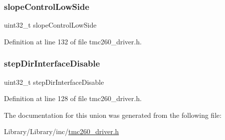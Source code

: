 \subsubsection{\texorpdfstring{slope\+Control\+Low\+Side}{slopeControlLowSide}}
{\footnotesize\ttfamily uint32\+\_\+t slope\+Control\+Low\+Side}



Definition at line 132 of file tmc260\+\_\+driver.\+h.

\mbox{\label{uniontmc260___driver_configuration_register___a912e153026c0015a0a66ceb21633866b}} 
\subsubsection{\texorpdfstring{step\+Dir\+Interface\+Disable}{stepDirInterfaceDisable}}
{\footnotesize\ttfamily uint32\+\_\+t step\+Dir\+Interface\+Disable}



Definition at line 128 of file tmc260\+\_\+driver.\+h.



The documentation for this union was generated from the following file\+:\begin{DoxyCompactItemize}
\item 
Library/\+Library/inc/\mbox{\hyperlink{tmc260__driver_8h}{tmc260\+\_\+driver.\+h}}\end{DoxyCompactItemize}
